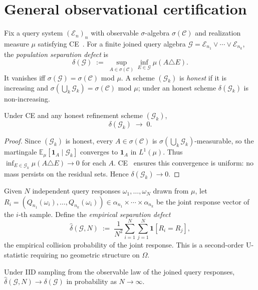 \section{General observational certification}
\label{III:sec:general}

Fix a query system $(\mathcal{E}_n)_n$ with observable $\sigma$-algebra
$\sigma(\mathcal{C})$ and realization measure $\mu$ satisfying
CE~\cite{mahon_paper1}.  For a finite joined query algebra
$\mathcal{G} = \mathcal{E}_{n_1} \vee \cdots \vee \mathcal{E}_{n_k}$,
the \emph{population separation defect} is
\[
  \delta(\mathcal{G})
  \;:=\;
  \sup_{A \in \sigma(\mathcal{C})} \inf_{E \in \mathcal{G}} \mu(A \triangle E).
\]
It vanishes iff $\sigma(\mathcal{G}) = \sigma(\mathcal{C})$ mod $\mu$.
A scheme $(\mathcal{G}_k)$ is \emph{honest} if it is increasing and
$\sigma(\bigcup_k \mathcal{G}_k) = \sigma(\mathcal{C})$ mod $\mu$; under
an honest scheme $\delta(\mathcal{G}_k)$ is non-increasing.

\begin{theorem}
\label{III:thm:population}
Under CE and any honest refinement scheme $(\mathcal{G}_k)$,
\[
  \delta(\mathcal{G}_k) \;\longrightarrow\; 0.
\]
\end{theorem}

\begin{proof}
Since $(\mathcal{G}_k)$ is honest, every $A \in \sigma(\mathcal{C})$ is
$\sigma(\bigcup_k \mathcal{G}_k)$-measurable, so the martingale
$\mathbb{E}_\mu[\mathbf{1}_A \mid \mathcal{G}_k]$ converges to
$\mathbf{1}_A$ in $L^1(\mu)$.  Thus $\inf_{E \in \mathcal{G}_k}
\mu(A \triangle E) \to 0$ for each $A$.  CE~\cite{mahon_paper1} ensures
this convergence is uniform: no mass persists on the residual sets.
Hence $\delta(\mathcal{G}_k) \to 0$.
\end{proof}

Given $N$ independent query responses $\omega_1, \ldots, \omega_N$ drawn
from $\mu$, let $R_i = (Q_{n_1}(\omega_i), \ldots, Q_{n_k}(\omega_i)) \in
\alpha_{n_1} \times \cdots \times \alpha_{n_k}$ be the joint response vector
of the $i$-th sample.  Define the \emph{empirical separation defect}
\[
  \hat\delta(\mathcal{G}, N)
  \;:=\;
  \frac{1}{N^2} \sum_{i=1}^N \sum_{j=1}^N \mathbf{1}[R_i = R_j],
\]
the empirical collision probability of the joint response.  This is a
second-order U-statistic requiring no geometric structure on $\Omega$.

\begin{theorem}
\label{III:thm:estimation}
Under IID sampling from the observable law of the joined query responses,
$\hat\delta(\mathcal{G}, N) \to \delta(\mathcal{G})$ in probability as
$N \to \infty$.
\end{theorem}

